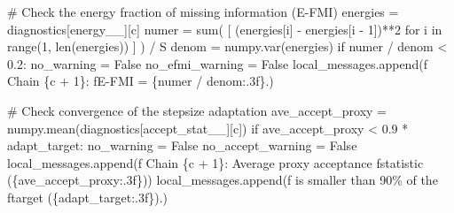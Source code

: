 \documentclass[
  letterpaper,
  DIV=11,
  numbers=noendperiod]{scrartcl}
\newenvironment{Shaded}{\begin{snugshade}}{\end{snugshade}}
\newcommand{\BuiltInTok}[1]{\textcolor[rgb]{0.00,0.23,0.31}{#1}}
\newcommand{\CommentTok}[1]{\textcolor[rgb]{0.37,0.37,0.37}{#1}}
\newcommand{\ControlFlowTok}[1]{\textcolor[rgb]{0.00,0.23,0.31}{#1}}
\newcommand{\DecValTok}[1]{\textcolor[rgb]{0.68,0.00,0.00}{#1}}
\newcommand{\FloatTok}[1]{\textcolor[rgb]{0.68,0.00,0.00}{#1}}
\newcommand{\KeywordTok}[1]{\textcolor[rgb]{0.00,0.23,0.31}{#1}}
\newcommand{\NormalTok}[1]{\textcolor[rgb]{0.00,0.23,0.31}{#1}}
\newcommand{\OperatorTok}[1]{\textcolor[rgb]{0.37,0.37,0.37}{#1}}
\newcommand{\SpecialCharTok}[1]{\textcolor[rgb]{0.37,0.37,0.37}{#1}}
\newcommand{\SpecialStringTok}[1]{\textcolor[rgb]{0.13,0.47,0.30}{#1}}
\newcommand{\StringTok}[1]{\textcolor[rgb]{0.13,0.47,0.30}{#1}}
\newcommand{\VariableTok}[1]{\textcolor[rgb]{0.07,0.07,0.07}{#1}}
\begin{document}
\begin{Shaded}
\begin{Highlighting}[]
    \CommentTok{\# Check the energy fraction of missing information (E{-}FMI)}
\NormalTok{    energies }\OperatorTok{=}\NormalTok{ diagnostics[}\StringTok{\textquotesingle{}energy\_\_\textquotesingle{}}\NormalTok{][c]}
\NormalTok{    numer }\OperatorTok{=} \BuiltInTok{sum}\NormalTok{( [ (energies[i] }\OperatorTok{{-}}\NormalTok{ energies[i }\OperatorTok{{-}} \DecValTok{1}\NormalTok{])}\OperatorTok{**}\DecValTok{2}
                   \ControlFlowTok{for}\NormalTok{ i }\KeywordTok{in} \BuiltInTok{range}\NormalTok{(}\DecValTok{1}\NormalTok{, }\BuiltInTok{len}\NormalTok{(energies)) ] ) }\OperatorTok{/}\NormalTok{ S}
\NormalTok{    denom }\OperatorTok{=}\NormalTok{ numpy.var(energies)}
    \ControlFlowTok{if}\NormalTok{ numer }\OperatorTok{/}\NormalTok{ denom }\OperatorTok{\textless{}} \FloatTok{0.2}\NormalTok{:}
\NormalTok{      no\_warning }\OperatorTok{=} \VariableTok{False}
\NormalTok{      no\_efmi\_warning }\OperatorTok{=} \VariableTok{False}
\NormalTok{      local\_messages.append(}\SpecialStringTok{f\textquotesingle{}  Chain }\SpecialCharTok{\{}\NormalTok{c }\OperatorTok{+} \DecValTok{1}\SpecialCharTok{\}}\SpecialStringTok{: \textquotesingle{}}
                            \SpecialStringTok{f\textquotesingle{}E{-}FMI = }\SpecialCharTok{\{}\NormalTok{numer }\OperatorTok{/}\NormalTok{ denom}\SpecialCharTok{:.3f\}}\SpecialStringTok{.\textquotesingle{}}\NormalTok{)}

    \CommentTok{\# Check convergence of the stepsize adaptation}
\NormalTok{    ave\_accept\_proxy }\OperatorTok{=}\NormalTok{ numpy.mean(diagnostics[}\StringTok{\textquotesingle{}accept\_stat\_\_\textquotesingle{}}\NormalTok{][c])}
    \ControlFlowTok{if}\NormalTok{ ave\_accept\_proxy }\OperatorTok{\textless{}} \FloatTok{0.9} \OperatorTok{*}\NormalTok{ adapt\_target:}
\NormalTok{      no\_warning }\OperatorTok{=} \VariableTok{False}
\NormalTok{      no\_accept\_warning }\OperatorTok{=} \VariableTok{False}
\NormalTok{      local\_messages.append(}\SpecialStringTok{f\textquotesingle{}  Chain }\SpecialCharTok{\{}\NormalTok{c }\OperatorTok{+} \DecValTok{1}\SpecialCharTok{\}}\SpecialStringTok{: Average proxy acceptance \textquotesingle{}}
                            \SpecialStringTok{f\textquotesingle{}statistic (}\SpecialCharTok{\{}\NormalTok{ave\_accept\_proxy}\SpecialCharTok{:.3f\}}\SpecialStringTok{)\textquotesingle{}}\NormalTok{)}
\NormalTok{      local\_messages.append(}\SpecialStringTok{f\textquotesingle{}           is smaller than 90\% of the \textquotesingle{}}
                            \SpecialStringTok{f\textquotesingle{}target (}\SpecialCharTok{\{}\NormalTok{adapt\_target}\SpecialCharTok{:.3f\}}\SpecialStringTok{).\textquotesingle{}}\NormalTok{)}
    

\end{Highlighting}
\end{Shaded}
\end{document}

